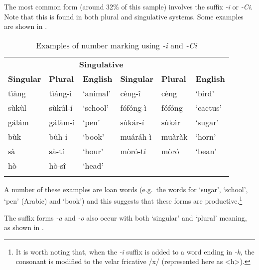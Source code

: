 \documentclass[output=paper]{langsci/langscibook}
\begin{document}
The most common form (around 32\% of this sample) involves the suffix \textit{-i} or \textit{-Ci}. Note that this is found in both plural and singulative systems. Some examples are shown in .  

\begin{table}
\begin{tabularx}{\textwidth}{XXXXXX}
\lsptoprule

\multicolumn{3}{c}{ \textbf{Plurative}} & \multicolumn{3}{c}{ \textbf{Singulative}}\\ \cmidrule(lr){1-3}\cmidrule(lr){4-6}
 \textbf{Singular} & \textbf{Plural} & \textbf{English} & \textbf{Singular} & \textbf{Plural} & \textbf{English}\\ \midrule
 t\`{i}\`{a}ng &  t\`{i}\'{a}ng-\`{i} & ‘animal’ &  c\`{e}ng-\^{i} &  c\`{e}ng & ‘bird’\\
 s\`{u}k\`{u}l &  s\`{u}k\'{u}l-\'{i} & ‘school’ &  f\'{o}f\'{o}ng-\`{i} &  f\'{o}f\'{o}ng & ‘cactus’\\
 g\'{a}l\'{a}m &  g\'{a}l\`{a}m-\`{i} & ‘pen’ &  s\`{u}k\'{a}r-\'{i} &  s\`{u}k\'{a}r & ‘sugar’\\
 b\`{u}k &  b\`{u}h-\'{i} & ‘book’ &  mu\'{a}r\'{a}h-\`{i} &  mu\`{a}r\`{a}k & ‘horn’\\
 s\`{a} &  s\`{a}-t\'{i} & ‘hour’ &  m\`{o}r\'{o}-t\'{i} &  m\`{o}r\'{o} & ‘bean’\\
 h\`{o} &  h\`{o}-s\^{i} & ‘head’ &  &  & \\
\lspbottomrule
\end{tabularx}
\caption{Examples of number marking using \textit{-i} and \textit{{}-Ci}}
\label{tab:moodie:10}
\end{table}

A number of these examples are loan words (e.g.\ the words for ‘sugar’, ‘school’, ‘pen’ (Arabic) and ‘book’) and this suggests that these forms are productive.\footnote{ It is worth noting that, when the \textit{{}-i} suffix is added to a word ending in \textit{{}-k,} the consonant is modified to the velar fricative /x/ (represented here as {\textless}h{\textgreater}).} 

The suffix forms \textit{{}-a }and \textit{{}-o} also occur with both `singular' and `plural' meaning, as shown in . 
\end{document}

